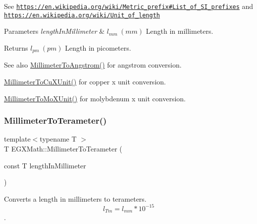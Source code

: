 See \href{https://en.wikipedia.org/wiki/Metric_prefix#List_of_SI_prefixes}{\tt https\+://en.\+wikipedia.\+org/wiki/\+Metric\+\_\+prefix\#\+List\+\_\+of\+\_\+\+S\+I\+\_\+prefixes} and \href{https://en.wikipedia.org/wiki/Unit_of_length}{\tt https\+://en.\+wikipedia.\+org/wiki/\+Unit\+\_\+of\+\_\+length} 
\begin{DoxyParams}{Parameters}
{\em length\+In\+Millimeter} & $ l_{mm}\ (mm)$ Length in millimeters. \\
\hline
\end{DoxyParams}
\begin{DoxyReturn}{Returns}
$ l_{pm}\ (pm)$ Length in picometers. 
\end{DoxyReturn}
\begin{DoxySeeAlso}{See also}
\mbox{\hyperlink{group___e_g_x_math-_conversions-_length_conversions-_millimeter-_non-_s_i_ga40e4659f4689e5be54f8e28fd8ce0008}{Millimeter\+To\+Angstrom()}} for angstrom conversion. 

\mbox{\hyperlink{group___e_g_x_math-_conversions-_length_conversions-_millimeter-_non-_s_i_gaa9a94e1f42047955530f673047c4370b}{Millimeter\+To\+Cu\+X\+Unit()}} for copper x unit conversion. 

\mbox{\hyperlink{group___e_g_x_math-_conversions-_length_conversions-_millimeter-_non-_s_i_ga1f0be98bc702f46a69579b27e05a2439}{Millimeter\+To\+Mo\+X\+Unit()}} for molybdenum x unit conversion. 
\end{DoxySeeAlso}
\mbox{\label{group___e_g_x_math-_conversions-_length_conversions-_millimeter-_s_i_ga0bd88917339b280d5df05adfddc6661a}} 
\subsubsection{\texorpdfstring{Millimeter\+To\+Terameter()}{MillimeterToTerameter()}}
{\footnotesize\ttfamily template$<$typename T $>$ \\
T E\+G\+X\+Math\+::\+Millimeter\+To\+Terameter (\begin{DoxyParamCaption}\item[{const T}]{length\+In\+Millimeter }\end{DoxyParamCaption})}



Converts a length in millimeters to terameters. \[ l_{Tm}=l_{mm} * 10^{-15} \]. 

